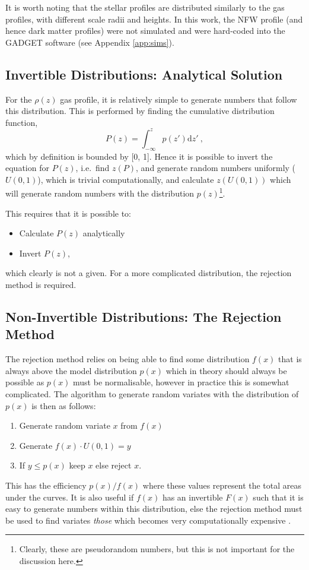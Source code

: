 It is worth noting that the stellar profiles are distributed similarly
to the gas profiles, with different scale radii and heights. In this work, the NFW profile (and hence dark matter profiles) were not simulated and were hard-coded into the GADGET software (see Appendix \ref{app:sims}).

\subsection{Invertible Distributions: Analytical
Solution}\label{easy-distributions---analytical-solution}

For the \(\rho(z)\) gas profile, it is relatively simple to generate
numbers that follow this distribution. This is performed by finding the
cumulative distribution function,
\[
    P(z) = \int_{-\infty}^z p(z') \mathrm{d}z'~,
\]
which by definition is bounded by {[}0, 1{]}. Hence it is possible to invert the
equation for \(P(z)\), i.e.~find \(z(P)\), and generate random numbers
uniformly (\(U(0, 1)\)), which is trivial computationally, and calculate
\(z(U(0, 1))\) which will generate random numbers with the distribution
\(p(z)\)\footnote{Clearly, these are pseudorandom numbers, but this is
  not important for the discussion here.}.

This requires that it is possible to:
\begin{itemize}
\item
  Calculate \(P(z)\) analytically
\item
  Invert \(P(z)\),
\end{itemize}
which clearly is not a given. For a more complicated distribution, the
rejection method is required.

\subsection{Non-Invertible Distributions: The Rejection
Method}\label{hard-distributions---the-rejection-method}

The rejection method relies on being able to find some distribution
\(f(x)\) that is always above the model distribution \(p(x)\) which in theory
should always be possible as \(p(x)\) must be normalisable, however
in practice this is somewhat complicated. The algorithm to generate
random variates with the distribution of \(p(x)\) is then as follows:

\begin{enumerate}
\item
  Generate random variate \(x\) from \(f(x)\)
\item
  Generate \(f(x) \cdot U(0, 1) = y\)
\item
  If \(y \leq p(x)\) keep \(x\) else reject \(x\).
\end{enumerate}

This has the efficiency \(p(x)/f(x)\) where these values represent the
total areas under the curves. It is also useful if \(f(x)\) has an
invertible \(F(x)\) such that it is easy to generate numbers within this
distribution, else the rejection method must be used to find variates
\emph{those} which becomes very computationally expensive \citep{press_numerical_2007}.

